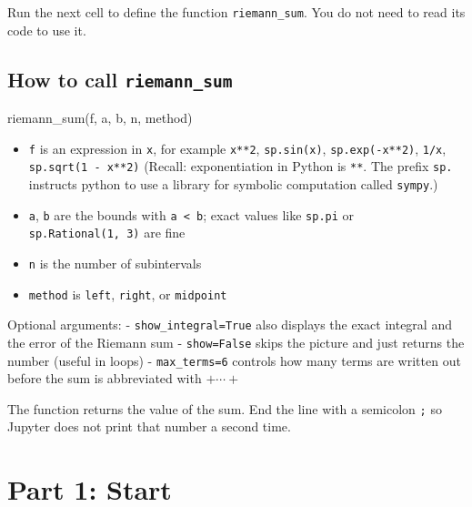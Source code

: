 \documentclass[
  letterpaper,
  DIV=11,
  numbers=noendperiod]{scrreprt}
\newenvironment{Shaded}{\begin{snugshade}}{\end{snugshade}}
\newcommand{\NormalTok}[1]{\textcolor[rgb]{0.00,0.23,0.31}{#1}}
\providecommand{\tightlist}{%
  \setlength{\itemsep}{0pt}\setlength{\parskip}{0pt}}
\theoremstyle{plain}
\theoremstyle{plain}
\theoremstyle{definition}
\theoremstyle{definition}
\theoremstyle{definition}
\theoremstyle{plain}
\theoremstyle{plain}
\theoremstyle{remark}
\begin{document}
Run the next cell to define the function \texttt{riemann\_sum}. You do
not need to read its code to use it.

\subsection{\texorpdfstring{How to call
\texttt{riemann\_sum}}{How to call riemann\_sum}}\label{how-to-call-riemann_sum}

\begin{Shaded}
\begin{Highlighting}[]
\NormalTok{riemann\_sum(f, a, b, n, method)}
\end{Highlighting}
\end{Shaded}

\begin{itemize}
\tightlist
\item
  \texttt{f} is an expression in \texttt{x}, for example \texttt{x**2},
  \texttt{sp.sin(x)}, \texttt{sp.exp(-x**2)}, \texttt{1/x},
  \texttt{sp.sqrt(1\ -\ x**2)} (Recall: exponentiation in Python is
  \texttt{**}. The prefix \texttt{sp.} instructs python to use a library
  for symbolic computation called \texttt{sympy}.)
\item
  \texttt{a}, \texttt{b} are the bounds with \texttt{a\ \textless{}\ b};
  exact values like \texttt{sp.pi} or \texttt{sp.Rational(1,\ 3)} are
  fine
\item
  \texttt{n} is the number of subintervals
\item
  \texttt{method} is \texttt{\textquotesingle{}left\textquotesingle{}},
  \texttt{\textquotesingle{}right\textquotesingle{}}, or
  \texttt{\textquotesingle{}midpoint\textquotesingle{}}
\end{itemize}

Optional arguments: - \texttt{show\_integral=True} also displays the
exact integral and the error of the Riemann sum - \texttt{show=False}
skips the picture and just returns the number (useful in loops) -
\texttt{max\_terms=6} controls how many terms are written out before the
sum is abbreviated with \(+ \cdots +\)

The function returns the value of the sum. End the line with a semicolon
\texttt{;} so Jupyter does not print that number a second time.

\section{Part 1: Start}\label{part-1-start}
\end{document}
